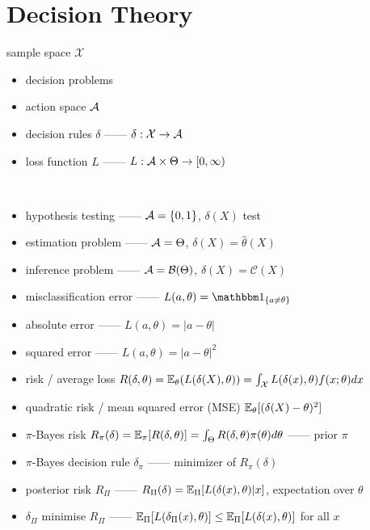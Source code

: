 \section{Decision Theory}\label{sec:decision-theory}

\begin{setting}
    sample space $\mathcal{X}$
\end{setting}

\begin{itemize}
    \item decision problems
    \item action space $\mathcal{A}$
    \item decision rules $\delta$ ------ $\delta:\mathcal{X} \rightarrow \mathcal{A}$
    \item loss function $L$ ------ $L:\mathcal{A} \times \Theta \rightarrow [0, \infty)$
\end{itemize}

\begin{example}\,
    \begin{itemize}
        \item hypothesis testing ------ $\mathcal{A} = \left\{ 0, 1 \right\}$, $\delta(X)$ test
        \item estimation problem ------ $\mathcal{A} = \Theta$, $\delta(X) = \hat \theta(X)$
        \item inference problem ------ $\mathcal{A} = \mathcal{B}(\Theta)$, $\delta(X) = \mathcal{C}(X)$
    \end{itemize}
\end{example}


\begin{itemize}
    \item misclassification error ------ $L(a, \theta) = \In_{\left\{ a \neq \theta \right\}}$
    \item absolute error ------ $L(a, \theta) = |a - \theta|$
    \item squared error ------ $L(a, \theta) = |a - \theta|^2$
    \item risk / average loss $R(\delta, \theta) = \mathbb{E}_\theta(L(\delta(X), \theta)) = \int_\mathcal{X} L(\delta(x), \theta)f(x; \theta)dx$
    \item quadratic risk / mean squared error (MSE) $\mathbb{E}_\theta[(\delta(X) - \theta)^2]$
    \item $\pi$-Bayes risk $R_\pi(\delta) = \mathbb{E}_\pi[R(\delta, \theta)] = \int_\Theta R(\delta, \theta)\pi(\theta) d\theta$ ------ prior $\pi$
    \item $\pi$-Bayes decision rule $\delta_{\pi}$ ------ minimizer of $R_\pi(\delta)$
    \item posterior risk $R_\Pi$ ------ $R_\Pi(\delta) = \mathbb{E}_\Pi[L(\delta(x), \theta)|x]$, expectation over $\theta$
    \item $\delta_{\Pi}$ minimise $R_\Pi$ ------ $\mathbb{E}_\Pi[L(\delta_\Pi(x), \theta)] \leq \mathbb{E}_{\Pi}[L(\delta(x), \theta)]$ for all $x$
\end{itemize}

